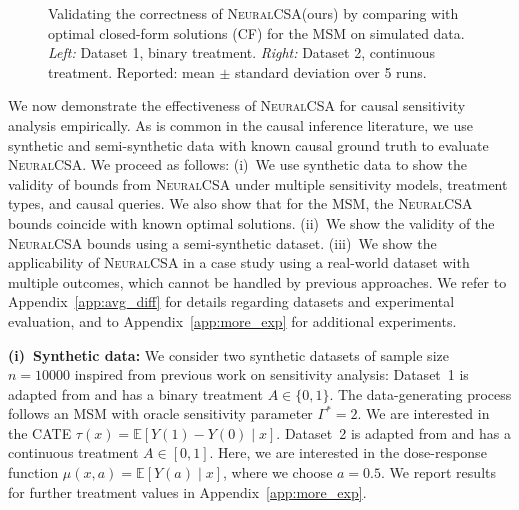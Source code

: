 \documentclass{article} %
\newcommand{\E}{\mathbb{E}}
\newcommand{\frameworkname}{\textsc{NeuralCSA}\xspace}
\theoremstyle{definition}
\theoremstyle{plain}
\begin{document}
\begin{figure}
\begin{subfigure}{0.30\textwidth}
\end{subfigure}
\vspace{-0.8cm}
\caption{Validating the correctness of \frameworkname (ours) by comparing with optimal closed-form solutions (CF) for the MSM on simulated data. \emph{Left:} Dataset 1, binary treatment. \emph{Right:} Dataset 2, continuous treatment. Reported: mean $\pm$ standard deviation over 5 runs.}
\label{fig:simulation_msm}
\vspace{-0.2cm}
\end{figure}
We now demonstrate the effectiveness of \frameworkname for causal sensitivity analysis empirically.
As is common in the causal inference literature, we use synthetic and semi-synthetic data with known causal ground truth to evaluate \frameworkname \citep{Kallus.2019, Jesson.2022}. We proceed as follows: (i)~We use synthetic data to show the validity of bounds from \frameworkname under multiple sensitivity models, treatment types, and causal queries. We also show that for the MSM, the \frameworkname bounds coincide with known optimal solutions. (ii)~We show the validity of the \frameworkname bounds using a semi-synthetic dataset. (iii)~We show the applicability of \frameworkname in a case study using a real-world dataset with multiple outcomes, which cannot be handled by previous approaches. We refer to Appendix~\ref{app:avg_diff} for details regarding datasets and experimental evaluation, and to Appendix~\ref{app:more_exp} for additional experiments.



\textbf{(i)~Synthetic data:} We consider two synthetic datasets of sample size $n=10000$ inspired from previous work on sensitivity analysis: Dataset~1 is adapted from \citet{Kallus.2019} and has a binary treatment $A \in \{0,1\}$. The data-generating process follows an MSM with oracle sensitivity parameter $\Gamma^\ast = 2$. We are interested in the CATE $\tau(x) = \E[Y(1) - Y(0) \mid x]$. Dataset~2 is adapted from \citet{Jesson.2022} and has a continuous treatment $A \in [0,1]$. Here, we are interested in the dose-response function $\mu(x, a) = \E[Y(a) \mid x]$, where we choose $a = 0.5$. We report results for further treatment values in Appendix~\ref{app:more_exp}.
\end{document}
